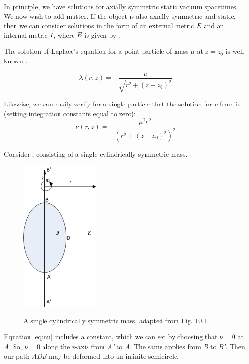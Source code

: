 \documentclass{article}
\begin{document}
In principle, we have solutions for axially symmetric static vacuum spacetimes. We now wish to add matter. If the object is also axially symmetric and static, then we can consider solutions in the form of an external metric $\emph{E}$ and an internal metric $\emph{I}$, where $\emph{E}$ is given by .

The solution of Laplace's equation for a point particle of mass $\mu$ at
$z=z_{0}$ is well known \cite{letelier1997superposition}:

\begin{equation}
\lambda (r,z)=-\frac{\mu}{\sqrt{r^{2}+\left(z-z_{0}\right)^{2}}}\label{eq:1-m}
\end{equation}

Likewise, we can easily verify for a single particle that the solution
for $\nu$ from  is (setting integration constants equal to zero):
\begin{equation}
\nu (r,z)=-\frac{\mu^{2}r^{2}}{\left(r^{2}+\left(z-z_{0}\right)^{2}\right)^{2}}
\end{equation}

Consider , consisting of a single cylindrically symmetric mass.

\begin{figure}
\centering
\caption[A single cylindrically symmetric mass]
{A single cylindrically symmetric mass, adapted from \cite{synge_relativity} Fig. 10.1}
\includegraphics[width=40mm]{Figure1.png}
\label{fig:single-mass}
\end{figure}

Equation \eqref{eq:nu} includes a constant, which we can set by choosing that $\nu=0$ at \emph{A}. So, $\nu=0$ along the z-axis from \emph{A'} to \emph{A}. The same applies from \emph{B} to \emph{B'}. Then our path \emph{ADB} may be deformed into an infinite semicircle.
\end{document}
